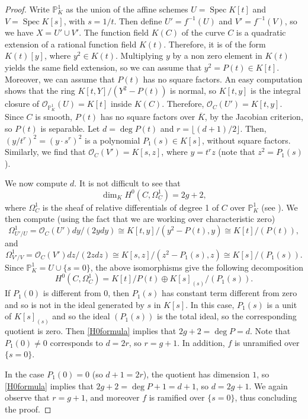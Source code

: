 \documentclass[a4paper, 12pt]{amsart}
\theoremstyle{definition}
\theoremstyle{plain}
\theoremstyle{plain}
\theoremstyle{plain}
\theoremstyle{plain}
\theoremstyle{remark}
\theoremstyle{remark}
\theoremstyle{plain}
\DeclareMathOperator{\Spec}{Spec}
\begin{document}
	\begin{proof}
		Write $\mathbb{P}^1_K$ as the union of the affine schemes $U=\Spec K[t]$ and $V=\Spec K[s]$, with $s=1/t$. Then define $U'=f^{-1}(U)$ and $V'=f^{-1}(V)$, so we have $X=U'\cup V'$. The function field $K(C)$ of the curve $C$ is a quadratic extension of a rational function field $K(t)$. Therefore, it is of the form $K(t)[y]$, where $y^2\in K(t)$. Multiplying $y$ by a non zero element in $K(t)$ yields the same field extension, so we can assume that $y^2=P(t)\in K[t]$. Moreover, we can assume that $P(t)$ has no square factors. An easy computation shows that the ring $K[t,Y]/(Y^2-P(t))$ is normal, so $K[t,y]$ is the integral closure of $\mathcal{O}_{\mathbb{P}^1_K}(U)=K[t]$ inside $K(C)$. Therefore, $\mathcal{O}_{C}(U')=K[t,y]$. Since $C$ is smooth, $P(t)$ has no square factors over $\overline{K}$, by the Jacobian criterion, so $P(t)$ is separable. Let $d=\deg P(t)$ and $r=\lfloor (d+1)/2\rfloor$. Then, $(y/t^r)^2=(y\cdot s^r)^2$ is a polynomial $P_1(s)\in K[s]$, without square factors. Similarly, we find that $\mathcal{O}_C(V')=K[s,z]$, where $y=t^rz$ (note that $z^2=P_1(s)$).
		
		We now compute $d$. It is not difficult to see that
		\begin{equation}\label{H0formula}
			\dim_K H^0(C,\Omega^1_C)=2g+2,
		\end{equation}
		where $\Omega^1_C$ is the sheaf of relative differentials of degree 1 of $C$ over $\mathbb{P}^1_K$ (see \cite{Liu_2002}). We then compute (using the fact that we are working over characteristic zero)
		\begin{equation*}
			\Omega^1_{U'/U}=\mathcal{O}_C(U')dy/(2ydy)\cong K[t,y]/(y^2-P(t),y)\cong K[t]/(P(t)),
		\end{equation*}
		and
		\begin{equation*}
			\Omega^1_{V'/V}=\mathcal{O}_C(V')dz/(2zdz)\cong K[s,z]/(z^2-P_1(s),z)\cong K[s]/(P_1(s)).
		\end{equation*}
		Since $\mathbb{P}^1_K=U\cup \{s=0\}$, the above isomorphisms give the following decomposition
		\begin{equation*}
			H^0(C,\Omega^1_{C})=K[t]/P(t)\oplus K[s]_{(s)}/(P_1(s)).
		\end{equation*}
		If $P_1(0)$ is different from $0$, then $P_1(s)$ has constant term different from zero and so is not in the ideal generated by $s$ in $K[s]$. In this case, $P_1(s)$ is a unit of $K[s]_{(s)}$ and so the ideal $(P_1(s))$ is the total ideal, so the corresponding quotient is zero. Then \eqref{H0formula} implies that $2g+2=\deg P=d$. Note that $P_1(0)\neq 0$ corresponds to $d=2r$, so $r=g+1$. In addition, $f$ is unramified over $\{s=0\}$.
		
		In the case $P_1(0)=0$ (so $d+1=2r$), the quotient has dimension $1$, so \eqref{H0formula} implies that $2g+2=\deg P+1=d+1$, so $d=2g+1$. We again observe that $r=g+1$, and moreover $f$ is ramified over $\{s=0\}$, thus concluding the proof.
	\end{proof}
\end{document}
